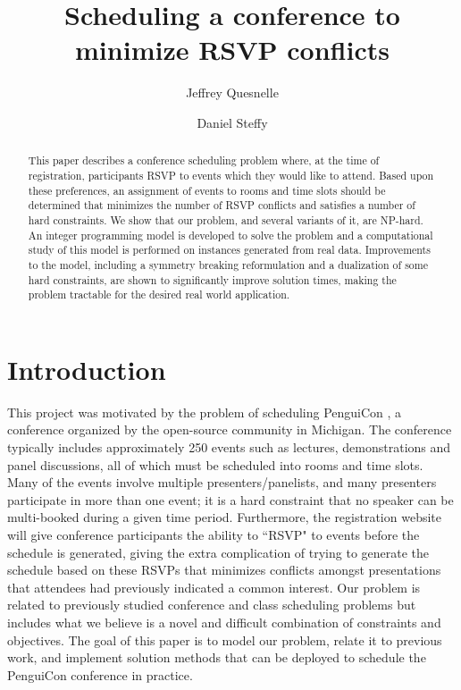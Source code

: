 \documentclass{svjour3}                     %
\begin{document}
	
\title{Scheduling a conference to minimize RSVP conflicts}
\author{Jeffrey Quesnelle \and Daniel Steffy}
	

\maketitle
	
\begin{abstract}
This paper describes a conference scheduling problem where, at the time of registration, participants RSVP to events which they would like to attend.
Based upon these preferences, an assignment of events to rooms and time slots should be determined that minimizes the number of RSVP conflicts and satisfies a number of hard constraints.
We show that our problem, and several variants of it, are NP-hard.
An integer programming model is developed to solve the problem and a computational study of this model is performed on instances generated from real data.
Improvements to the model, including a symmetry breaking reformulation and a dualization of some hard constraints, are shown to significantly improve solution times, making the problem tractable for the desired real world application.
\end{abstract}

\section{Introduction}


This project was motivated by the problem of scheduling PenguiCon \cite{pc}, a conference organized by the open-source community in Michigan.  
The conference typically includes approximately 250 events such as lectures, demonstrations and panel discussions, all of which must be scheduled into rooms and time slots.
Many of the events involve multiple presenters/panelists, and many presenters participate in more than one event; it is a hard constraint that no speaker can be multi-booked during a given time period.
Furthermore, the registration website will give conference participants the ability to ``RSVP" to events before the schedule is generated, giving the extra complication of trying to generate the schedule based on these RSVPs that minimizes conflicts amongst presentations that attendees had previously indicated a common interest.
Our problem is related to previously studied conference and class scheduling problems but includes what we believe is a novel and difficult combination of constraints and objectives.
The goal of this paper is to model our problem, relate it to previous work, and implement solution methods that can be deployed to schedule the PenguiCon conference in practice.
\end{document}
